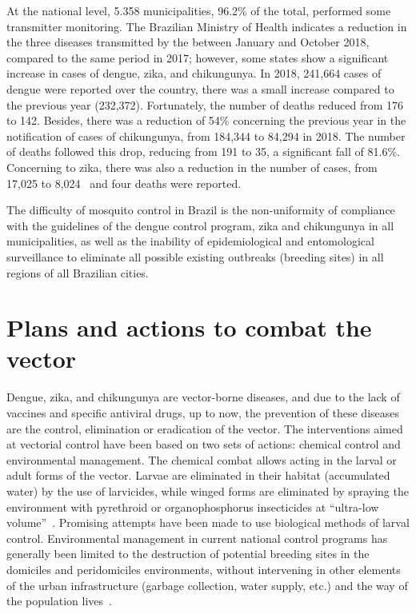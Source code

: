 At the national level, 5.358 municipalities, 96.2\% of the total, performed some transmitter monitoring.
The Brazilian Ministry of Health indicates a reduction in the three diseases transmitted by the \Aedes between January and October 2018, compared to the same period in 2017; however, some states show a significant increase in cases of dengue, zika, and chikungunya.
In 2018, 241,664 cases of dengue were reported over the country, there was a small increase compared to the previous year (232,372).
Fortunately, the number of deaths reduced from 176 to 142.
%
Besides, there was a reduction of 54\% concerning the previous year in the notification of cases of chikungunya, from 184,344 to 84,294 in 2018.
The number of deaths followed this drop, reducing from 191 to 35, a significant fall of 81.6\%.
%
Concerning to zika, there was also a reduction in the number of cases, from 17,025 to 8,024~\cite{web:brasil2018liraa} and four deaths were reported.

The difficulty of mosquito control in Brazil is the non-uniformity of compliance with the guidelines of the dengue control program, zika and chikungunya in all municipalities, as well as the inability of epidemiological and entomological surveillance to eliminate all possible existing outbreaks (breeding sites) in all regions of all Brazilian cities.

\section{Plans and actions to combat the vector}
%
Dengue, zika, and chikungunya are vector-borne diseases, and due to the lack of vaccines and specific antiviral drugs, up to now, the prevention of these diseases are the control, elimination or eradication of the vector.
%
%
The interventions aimed at vectorial control have been based on two sets of actions: chemical control and environmental management.
The chemical combat allows acting in the larval or adult forms of the vector.
Larvae are eliminated in their habitat (accumulated water) by the use of larvicides, while winged forms are eliminated by spraying the environment with pyrethroid or organophosphorus insecticides at “ultra-low volume”~\cite{araujo2015aedes}.
Promising attempts have been made to use biological methods of larval control.
Environmental management in current national control programs has generally been limited to the destruction of potential breeding sites in the domiciles and peridomiciles environments, without intervening in other elements of the urban infrastructure (garbage collection, water supply, etc.) and the way of the population lives~\cite{araujo2015aedes}.

